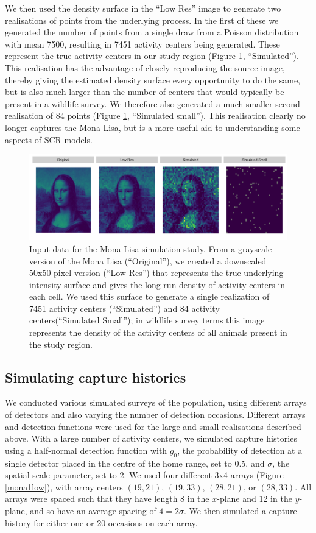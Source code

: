\documentclass[a4paper,12pt]{article}
\begin{document}
We then used the density surface in the ``Low Res'' image to generate two realisations of points from the underlying process. In the first of these we generated the number of points from a single draw from a Poisson distribution with mean 7500, resulting in 7451 activity centers being generated. These represent the true activity centers in our study region (Figure \ref{mlinputs}, ``Simulated''). This realisation has the advantage of closely reproducing the source image, thereby giving the estimated density surface every opportunity to do the same, but is also much larger than the number of centers that would typically be present in a wildlife survey. We therefore also generated a much smaller second realisation of 84 points (Figure \ref{mlinputs}, ``Simulated small''). This realisation clearly no longer captures the Mona Lisa, but is a more useful aid to understanding some aspects of SCR models.

\begin{figure}[htbp]
\centering
\includegraphics[width=1\textwidth]{mona_inputdata.png}
\caption{Input data for the Mona Lisa simulation study. From a grayscale version of the Mona Lisa (``Original''), we created a downscaled 50x50 pixel version (``Low Res'') that represents the true underlying intensity surface and gives the long-run density of activity centers in each cell. We used this surface to generate a single realization of 7451 activity centers (``Simulated'') and 84 activity centers(``Simulated Small''); in wildlife survey terms this image represents the density of the activity centers of all animals present in the study region.}
\label{mlinputs}
\end{figure}

\subsection{Simulating capture histories} \label{s:simcapthist}

We conducted various simulated surveys of the population, using different arrays of detectors and also varying the number of detection occasions. Different arrays and detection functions were used for the large and small realisations described above. With a large number of activity centers, we simulated capture histories using a half-normal detection function with $g_0$, the probability of detection at a single detector placed in the centre of the home range, set to 0.5, and $\sigma$, the spatial scale parameter, set to 2. We used four different 3x4 arrays (Figure \ref{mona1low}), with array centers $(19,21)$, $(19,33)$, $(28, 21)$, or $(28, 33)$. All arrays were spaced such that they have length 8 in the $x$-plane and 12 in the $y$-plane, and so have an average spacing of $4=2\sigma$. We then simulated a capture history for either one or 20 occasions on each array.
\end{document}
